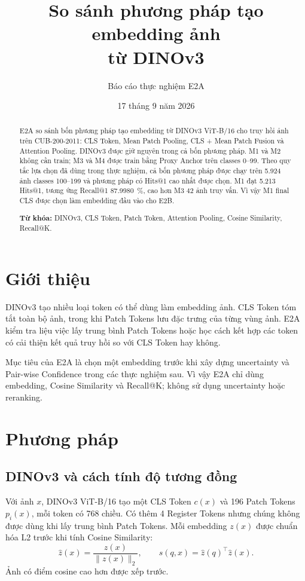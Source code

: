 \documentclass[11pt,a4paper]{article}
\title{\bfseries\LARGE So sánh phương pháp tạo embedding ảnh\\[0.3em]
từ DINOv3}
\author{Báo cáo thực nghiệm E2A}
\date{17 tháng 9 năm 2026}
\begin{document}
\maketitle
\thispagestyle{plain}

\begin{abstract}
E2A so sánh bốn phương pháp tạo embedding từ DINOv3 ViT-B/16 cho truy hồi
ảnh trên CUB-200-2011: CLS Token, Mean Patch Pooling, CLS + Mean Patch Fusion
và Attention Pooling. DINOv3 được giữ nguyên trong cả bốn phương pháp.
M1 và M2 không cần train; M3 và M4 được train bằng Proxy Anchor trên classes
0--99. Theo quy tắc lựa chọn đã dùng trong thực nghiệm, cả bốn phương pháp
được chạy trên 5.924 ảnh classes 100--199 và phương pháp có Hits@1 cao nhất
được chọn. M1 đạt 5.213 Hits@1, tương ứng Recall@1
\SI{87.9980}{\percent}, cao hơn M3 42 ảnh truy vấn. Vì vậy M1 final CLS
được chọn làm embedding đầu vào cho E2B.

\noindent\textbf{Từ khóa:} DINOv3, CLS Token, Patch Token, Attention Pooling,
Cosine Similarity, Recall@K.
\end{abstract}

\section{Giới thiệu}
DINOv3 tạo nhiều loại token có thể dùng làm embedding ảnh. CLS Token tóm tắt
toàn bộ ảnh, trong khi Patch Tokens lưu đặc trưng của từng vùng ảnh. E2A kiểm
tra liệu việc lấy trung bình Patch Tokens hoặc học cách kết hợp các token có
cải thiện kết quả truy hồi so với CLS Token hay không.

Mục tiêu của E2A là chọn một embedding trước khi xây dựng uncertainty và
Pair-wise Confidence trong các thực nghiệm sau. Vì vậy E2A chỉ dùng embedding,
Cosine Similarity và Recall@K; không sử dụng uncertainty hoặc reranking.

\section{Phương pháp}
\subsection{DINOv3 và cách tính độ tương đồng}
Với ảnh $x$, DINOv3 ViT-B/16 tạo một CLS Token $c(x)$ và 196 Patch Tokens
$p_i(x)$, mỗi token có 768 chiều. Có thêm 4 Register Tokens nhưng chúng không
được dùng khi lấy trung bình Patch Tokens. Mỗi embedding $z(x)$ được chuẩn hóa
L2 trước khi tính Cosine Similarity:
\begin{equation}
 \widehat z(x)=\frac{z(x)}{\lVert z(x)\rVert_2},
 \qquad s(q,x)=\widehat z(q)^\top\widehat z(x).
\end{equation}
Ảnh có điểm cosine cao hơn được xếp trước.
\end{document}
